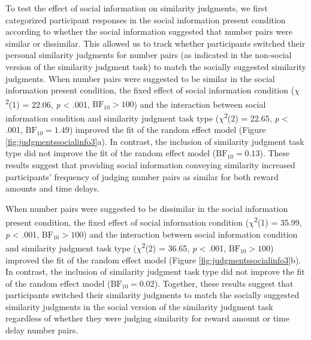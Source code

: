 \documentclass[
  pub,floatsintext]{apa6}
\begin{document}
To test the effect of social information on similarity judgments, we first categorized participant responses in the social information present condition according to whether the social information suggested that number pairs were similar or dissimilar. This allowed us to track whether participants switched their personal similarity judgments for number pairs (as indicated in the non-social version of the similarity judgment task) to match the socially suggested similarity judgments. When number pairs were suggested to be similar in the social information present condition, the fixed effect of social information condition (\(\chi\)\textsuperscript{2}(1) = 22.06, \emph{p} \textless{} .001, \(\mathrm{BF}_{\textrm{10}} > 100\)) and the interaction between social information condition and similarity judgment task type (\(\chi\)\textsuperscript{2}(2) = 22.65, \emph{p} \textless{} .001, \(\mathrm{BF}_{\textrm{10}} = 1.49\)) improved the fit of the random effect model (Figure \ref{fig:judgmentssocialinfo3}a). In contrast, the inclusion of similarity judgment task type did not improve the fit of the random effect model (\(\mathrm{BF}_{\textrm{10}} = 0.13\)). These results suggest that providing social information conveying similarity increased participants' frequency of judging number pairs as similar for both reward amounts and time delays.

When number pairs were suggested to be dissimilar in the social information present condition, the fixed effect of social information condition (\(\chi\)\textsuperscript{2}(1) = 35.99, \emph{p} \textless{} .001, \(\mathrm{BF}_{\textrm{10}} > 100\)) and the interaction between social information condition and similarity judgment task type (\(\chi\)\textsuperscript{2}(2) = 36.65, \emph{p} \textless{} .001, \(\mathrm{BF}_{\textrm{10}} > 100\)) improved the fit of the random effect model (Figure \ref{fig:judgmentssocialinfo3}b). In contrast, the inclusion of similarity judgment task type did not improve the fit of the random effect model (\(\mathrm{BF}_{\textrm{10}} = 0.02\)). Together, these results suggest that participants switched their similarity judgments to match the socially suggested similarity judgments in the social version of the similarity judgment task regardless of whether they were judging similarity for reward amount or time delay number pairs.
\end{document}
